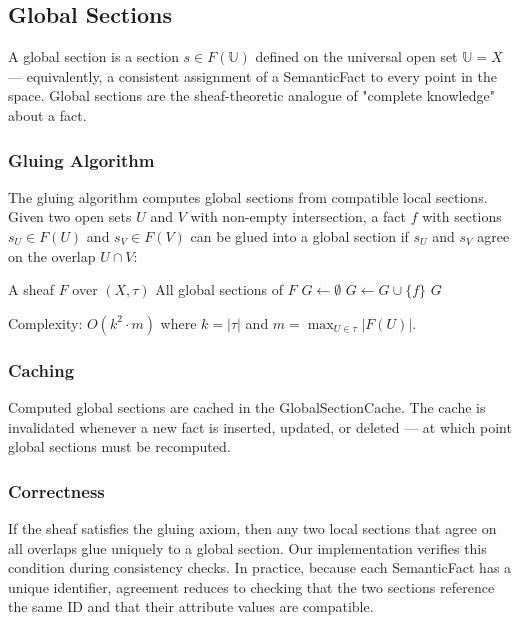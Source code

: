 
\subsection{Global Sections}

A global section is a section $s \in F(\mathbb{U})$ defined on the universal open set $\mathbb{U} = X$ — equivalently, a consistent assignment of a SemanticFact to every point in the space. Global sections are the sheaf-theoretic analogue of "complete knowledge" about a fact.

\subsubsection{Gluing Algorithm}

The gluing algorithm computes global sections from compatible local sections. Given two open sets $U$ and $V$ with non-empty intersection, a fact $f$ with sections $s_U \in F(U)$ and $s_V \in F(V)$ can be glued into a global section if $s_U$ and $s_V$ agree on the overlap $U \cap V$:

\begin{algorithm}[H]
\caption{Compute global sections via gluing}
\label{alg:gluing}
\begin{algorithmic}[1]
\Require A sheaf $F$ over $(X, \tau)$
\Ensure All global sections of $F$
\State $G \gets \emptyset$
            \State $G \gets G \cup \{f\}$
        \EndIf
    \EndFor
\EndFor
\Return $G$
\end{algorithmic}
\end{algorithm}

\noindent Complexity: $O(k^2 \cdot m)$ where $k = |\tau|$ and $m = \max_{U \in \tau} |F(U)|$.

\subsubsection{Caching}

Computed global sections are cached in the GlobalSectionCache. The cache is invalidated whenever a new fact is inserted, updated, or deleted — at which point global sections must be recomputed.

\subsubsection{Correctness}

If the sheaf satisfies the gluing axiom, then any two local sections that agree on all overlaps glue uniquely to a global section. Our implementation verifies this condition during consistency checks. In practice, because each SemanticFact has a unique identifier, agreement reduces to checking that the two sections reference the same ID and that their attribute values are compatible.
\endinput
